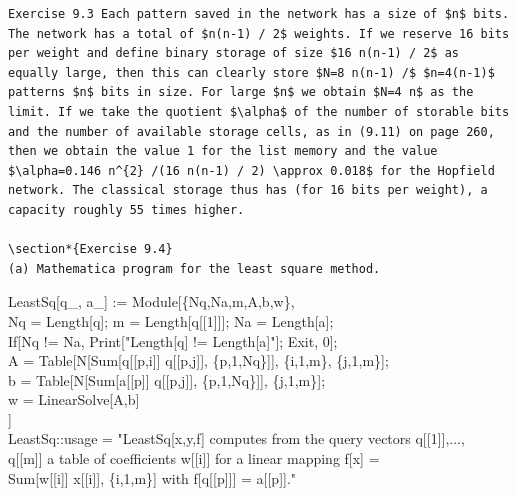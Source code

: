 \documentclass[10pt]{article}
\begin{document}
\begin{verbatim}
Exercise 9.3 Each pattern saved in the network has a size of $n$ bits. The network has a total of $n(n-1) / 2$ weights. If we reserve 16 bits per weight and define binary storage of size $16 n(n-1) / 2$ as equally large, then this can clearly store $N=8 n(n-1) /$ $n=4(n-1)$ patterns $n$ bits in size. For large $n$ we obtain $N=4 n$ as the limit. If we take the quotient $\alpha$ of the number of storable bits and the number of available storage cells, as in (9.11) on page 260, then we obtain the value 1 for the list memory and the value $\alpha=0.146 n^{2} /(16 n(n-1) / 2) \approx 0.018$ for the Hopfield network. The classical storage thus has (for 16 bits per weight), a capacity roughly 55 times higher.

\section*{Exercise 9.4}
(a) Mathematica program for the least square method.
\end{verbatim}


LeastSq[q\_, a\_] := Module[\{Nq,Na,m,A,b,w\},\\[0pt]
Nq = Length[q]; m = Length[q[[1]]]; Na = Length[a];\\[0pt]
If[Nq != Na, Print["Length[q] != Length[a]"]; Exit, 0];\\[0pt]
A = Table[N[Sum[q[[p,i]] q[[p,j]], \{p,1,Nq\}]], \{i,1,m\}, \{j,1,m\}];\\[0pt]
b = Table[N[Sum[a[[p]] q[[p,j]], \{p,1,Nq\}]], \{j,1,m\}];\\[0pt]
w = LinearSolve[A,b]\\[0pt]
]\\[0pt]
LeastSq::usage = "LeastSq[x,y,f] computes from the query vectors q[[1]],...,\\[0pt]
q[[m]] a table of coefficients w[[i]] for a linear mapping f[x] =\\[0pt]
Sum[w[[i]] x[[i]], \{i,1,m\}] with f[q[[p]]] = a[[p]]."
\end{document}
